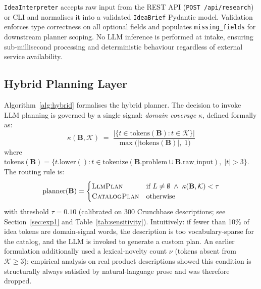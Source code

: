 \documentclass[preprint,12pt]{elsarticle}
\newcommand{\B}{\mathbf{B}}
\newcommand{\calK}{\mathcal{K}}
\begin{document}
\texttt{IdeaInterpreter} accepts raw input from the REST API
(\texttt{POST /api/research}) or CLI and normalises it into a validated
\texttt{IdeaBrief} Pydantic model. Validation enforces type correctness on all
optional fields and populates \texttt{missing\_fields} for downstream planner
scoping. No LLM inference is performed at intake, ensuring sub-millisecond
processing and deterministic behaviour regardless of external service
availability.

\subsection{Hybrid Planning Layer}
\label{sec:planner}

Algorithm~\ref{alg:hybrid} formalises the hybrid planner. The decision to invoke
LLM planning is governed by a single signal: \emph{domain coverage} $\kappa$,
defined formally as:
\begin{equation}
  \kappa(\B, \calK) \;=\;
  \frac{\bigl|\{t \in \text{tokens}(\B) : t \in \calK\}\bigr|}
       {\max\!\bigl(|\text{tokens}(\B)|,\; 1\bigr)}
  \label{eq:kappa}
\end{equation}
where $\text{tokens}(\B) = \{t.\text{lower}() : t \in \text{tokenize}(\B.\text{problem}
\cup \B.\text{raw\_input}),\; |t| > 3\}$. The routing rule is:
\begin{equation}
  \text{planner}(\B) =
  \begin{cases}
    \textsc{LlmPlan}  & \text{if } L \ne \emptyset \;\wedge\; \kappa(\B,\calK) < \tau \\
    \textsc{CatalogPlan} & \text{otherwise}
  \end{cases}
  \label{eq:routing}
\end{equation}
with threshold $\tau = 0.10$ (calibrated on 300 Crunchbase descriptions;
see Section~\ref{sec:exp1} and Table~\ref{tab:sensitivity}).
Intuitively: if fewer than 10\% of idea tokens are domain-signal words, the
description is too vocabulary-sparse for the catalog, and the LLM is invoked to
generate a custom plan. An earlier formulation additionally used a lexical-novelty
count $\nu$ (tokens absent from $\calK \ge 3$); empirical analysis on real product
descriptions showed this condition is structurally always satisfied by
natural-language prose and was therefore dropped.
\end{document}
